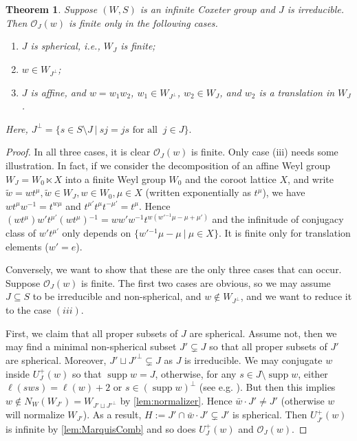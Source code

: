 \documentclass[a4paper, reqno, 14pt]{amsart}
\def\i{{^{-1}}}
\def\subset{\subseteq}
\def\co{\mathcal{O}}
\DeclareMathOperator{\supp}{supp}
\newtheorem{thm}{Theorem}[section]
\theoremstyle{definition}
\theoremstyle{remark}
\numberwithin{equation}{section}
\numberwithin{thm}{section}
\begin{document}
    \begin{thm}\label{thm:classification} Suppose $(W,S)$ is an infinite Coxeter group and $J$ is irreducible. Then $\co_J(w)$ is finite only in the following cases. 
    \begin{enumerate}
        \item $J$ is spherical, i.e., $W_J$ is finite;
        \item $w\in W_{J^\perp}$;
        \item $J$ is affine, and $w=w_1 w_2$, $w_1\in W_{J^\perp}$, $w_2\in W_J$, and $w_2$ is a translation in $W_J$.
        
    \end{enumerate}
    Here, $J^\perp=\{s\in S\setminus J\ | \  sj=js\text{ for all } \ j\in J \}.$
    \end{thm}
    \begin{proof}
        In all three cases, it is clear $\co_J(w)$ is finite. Only case (iii) needs some illustration. In fact, if we consider the decomposition of an affine Weyl group $W_J=W_0\ltimes X$ into a finite Weyl group $W_0$ and the coroot lattice $X$, and write $\tilde{w}=wt^\mu, \tilde{w}\in W_J, w\in W_0, \mu\in X$ (written exponentially as $t^\mu$), we have $wt^\mu w^{-1} =t^{w\mu}$ and $t^{\mu'}t^\mu t^{-\mu'}=t^\mu$. Hence $(wt^\mu) w't^{\mu'} (wt^\mu)\i = ww'w\i t^{w(w'\i\mu-\mu+\mu')}$ and the infinitude of conjugacy class of $w't^{\mu'}$ only depends on $\{w'\i\mu-\mu\ |\ \mu\in X\}$. It is finite only for translation elements ($w'=e$).
        
        Conversely, we want to show that these are the only three cases that can occur. Suppose $\co_J(w)$ is finite. The first two cases are obvious, so we may assume $J\subset S$ to be irreducible and non-spherical, and $w\notin W_{J^\perp}$, and we want to reduce it to the case $(iii)$.

        First, we claim that all proper subsets of $J$ are spherical. Assume not, then we may find a minimal non-spherical subset $J'\subsetneq J$ so that all proper subsets of $J'$ are spherical. Moreover, $J'\sqcup J'^\perp\subsetneq J$ as $J$ is irreducible. We may conjugate $w$ inside $U_J^+(w)$ so that $\supp w=J$, otherwise, for any $s\in J\setminus \supp w$, either $\ell(sws)=\ell(w)+2$ or $s\in (\supp w)^\perp$ (see e.g. \cite[Lemma 2.37]{abramenko2008buildings}). But then this implies $w\notin N_W(W_{J'})=W_{J'\sqcup J'^\perp}$ by \cref{lem:normalizer}. Hence $\bar{w}\cdot J'\neq J'$ (otherwise $w$ will normalize $W_{J'}$). As a result, $H:=J'\cap \bar{w}\cdot J'\subsetneq J'$ is spherical. Then $U^+_{J'}(w)$ is infinite by \cref{lem:MarquisComb} and so does $U^+_J(w)$ and $\co_J(w)$.


\end{proof}
\end{document}
